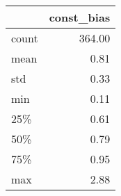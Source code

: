 \begin{tabular}{lr}
\toprule
{} &  const\_bias \\
\midrule
count &      364.00 \\
mean  &        0.81 \\
std   &        0.33 \\
min   &        0.11 \\
25\%   &        0.61 \\
50\%   &        0.79 \\
75\%   &        0.95 \\
max   &        2.88 \\
\bottomrule
\end{tabular}
